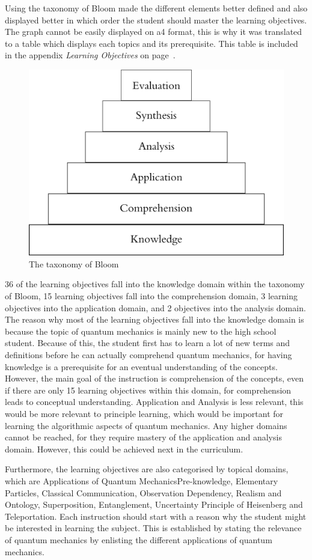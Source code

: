 \documentclass[11pt,twoside]{report} %
\begin{document}
Using the taxonomy of Bloom made the different elements better defined and also displayed better in which order the student should master the learning objectives. The graph cannot be easily displayed on a4 format, this is why it was translated to a table which displays each topics and its prerequisite. This table is included in the appendix \emph{Learning Objectives} on page~\pageref{app:learningobjectives}.

\begin{figure}[h]
\centering
\includegraphics[width=.4\textwidth]{bloom}
\caption{The taxonomy of Bloom \protect\cite{bloom}\label{fig:bloom}}
\end{figure}

36 of the learning objectives fall into the knowledge domain within the taxonomy of Bloom, 15 learning objectives fall into the comprehension domain, 3 learning objectives into the application domain, and 2 objectives into the analysis domain. The reason why most of the learning objectives fall into the knowledge domain is because the topic of quantum mechanics is mainly new to the high school student. Because of this, the student first has to learn a lot of new terms and definitions before he can actually comprehend quantum mechanics, for having knowledge is a prerequisite for an eventual understanding of the concepts. However, the main goal of the instruction is comprehension of the concepts, even if there are only 15 learning objectives within this domain, for comprehension leads to conceptual understanding. Application and Analysis is less relevant, this would be more relevant to principle learning, which would be important for learning the algorithmic aspects of quantum mechanics. Any higher domains cannot be reached, for they require mastery of the application and analysis domain. However, this could be achieved next in the curriculum.

Furthermore, the learning objectives are also categorised by topical domains, which are Applications of Quantum MechanicsPre-knowledge, Elementary Particles, Classical Communication, Observation Dependency, Realism and Ontology, Superposition, Entanglement, Uncertainty Principle of Heisenberg and Teleportation. Each instruction should start with a reason why the student might be interested in learning the subject. This is established by stating the relevance of quantum mechanics by enlisting the different applications of quantum mechanics.
\end{document}
